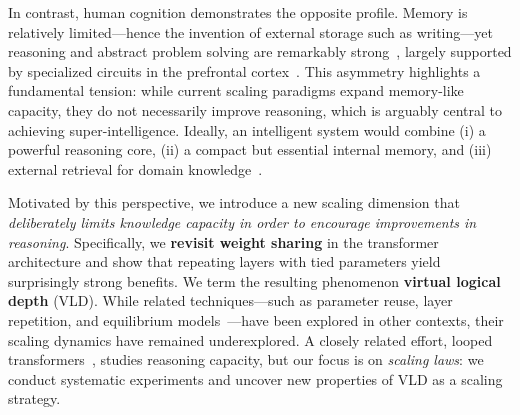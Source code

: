 \documentclass{article} %
\begin{document}
In contrast, human cognition demonstrates the opposite profile. Memory is relatively limited—hence the invention of external storage such as writing—yet reasoning and abstract problem solving are remarkably strong~\citep{Chollet2019Intelligence, Xu2023BrainInspired, Wang2024Schrodinger}, largely supported by specialized circuits in the prefrontal cortex~\citep{raichle2009brief}. This asymmetry highlights a fundamental tension: while current scaling paradigms expand memory-like capacity, they do not necessarily improve reasoning, which is arguably central to achieving super-intelligence. Ideally, an intelligent system would combine (i) a powerful reasoning core, (ii) a compact but essential internal memory, and (iii) external retrieval for domain knowledge~\citep{kumaran2016learning}.


Motivated by this perspective, we introduce a new scaling dimension that \textit{deliberately limits knowledge capacity in order to encourage improvements in reasoning}. 
Specifically, we \textbf{revisit weight sharing} in the transformer architecture and show that repeating layers with tied parameters yield surprisingly strong benefits. We term the resulting phenomenon \textbf{virtual logical depth} (VLD). 
While related techniques—such as parameter reuse, layer repetition, and equilibrium models~\citep{Lan2020ALBERT, Dehghani2019Universal, Bai2019DEQ, hay2024dynamic, bhojanapalli2021leveraging, reid2021subformer, takase2021lessons, liu2023enhancing}—have been explored in other contexts, their scaling dynamics have remained underexplored. A closely related effort, looped transformers~\citep{saunshi2025reasoning}, studies reasoning capacity, but our focus is on \emph{scaling laws}: we conduct systematic experiments and uncover new properties of VLD as a scaling strategy.
\end{document}
